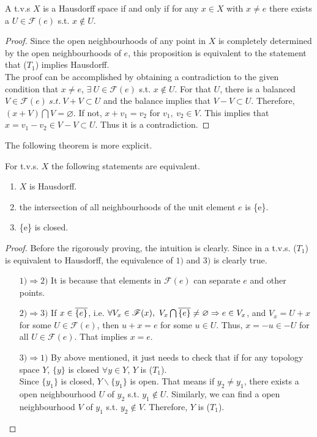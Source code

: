 \documentclass[a4paper,11pt]{report}
\begin{document}
\begin{prop}
	A t.v.s $X$ is a Hausdorff space if and only if for any $x \in X$ with $x \neq e$ there exists a $U \in \mathscr{F}(e)$ s.t. $x \notin U$.
\end{prop}
\begin{proof}
	Since the open neighbourhoods of any point in $X$ is completely determined by the open neighbourhoods of $e$, this proposition is equivalent to the statement that ($T_1$) implies Hausdorff.\\
	The proof can be accomplished by obtaining a contradiction to the given condition that $x \neq e$, $\exists ~U \in \mathscr{F}(e)$ s.t. $x \notin U$. For that $U$, there is a balanced $V \in \mathscr{F}(e) ~s.t.~ V+V \subset U$ and the balance implies that $V-V \subset U$. Therefore, $(x+V) \bigcap V = \varnothing$. If not, $x+v_1 = v_2$ for $v_1,~ v_2 \in V$. This implies that $x = v_1 - v_2 \in V-V \subset U$. Thus it is a contradiction.
\end{proof}
The following theorem is more explicit.
\begin{thm} \label{thm1}
	For t.v.s. $X$ the following statements are equivalent.
	\begin{enumerate}[label=\arabic*)]
		\item $X$ is Hausdorff.
		\item the intersection of all neighbourhoods of the unit element $e$ is \{e\}.
		\item \{e\} is closed.
	\end{enumerate}
\end{thm}
\begin{proof}
	Before the rigorously proving, the intuition is clearly. Since in a t.v.s. ($T_1$) is equivalent to Hausdorff, the equivalence of $1)$ and $3)$ is clearly true.
	\begin{enumerate}
		\item[$1) \Rightarrow 2)$] It is because that elements in $\mathscr{F}(e)$ can separate $e$ and other points.
		\item[$2) \Rightarrow 3)$] If $x \in \overline{\{e\}}$, i.e. $\forall V_x \in \mathscr{F}(x),~ V_x \bigcap \overline{\{e\}} \neq \varnothing \Rightarrow e \in V_x$, and $V_x = U + x$ for some $U \in \mathscr{F}(e)$, then $u + x = e$ for some $u \in U$. Thus, $x = -u \in -U$ for all $U \in \mathscr{F}(e)$. That implies $x = e$.
		\item[$3) \Rightarrow 1)$] By above mentioned, it just needs to check that if for any topology space $Y$, $\{y\}$ is closed $\forall y \in Y$, $Y$ is ($T_1$). \\
		Since $\{y_1\}$ is closed, $Y \backslash \{y_1\}$ is open. That means if $y_2 \neq y_1$, there exists a open neighbourhood $U$ of $y_2$ s.t. $y_1 \notin U$. Similarly, we can find a open neighbourhood $V$ of $y_1$ s.t. $y_2 \notin V$. Therefore, $Y$ is ($T_1$). \qedhere
	\end{enumerate}	
\end{proof}
\end{document}
